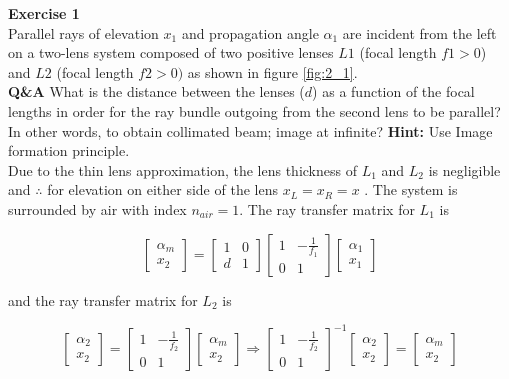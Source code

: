 \documentclass[main.tex]{subfiles}
\begin{document}
\textbf{Exercise 1}\\
Parallel rays of elevation $x_1$ and propagation angle $\alpha_1$ are incident from the left on a two-lens system composed of two positive lenses $L1$ (focal length $f1>0$) and $L2$ (focal length $f2 >0)$ as shown in figure \ref{fig:2_1}.\\

\textbf{Q\&A} What is the distance between the lenses ($d$) as a function of the focal lengths in order for the ray bundle outgoing from the second lens to be parallel? In other words, to obtain collimated beam; image at infinite? \textbf{Hint:} Use Image formation principle.\\


Due to the thin lens approximation, the lens thickness of $L_1$ and $L_2$ is negligible and $\therefore$ for elevation on either side of the lens $x_L = x_R = x$ . The system is surrounded by air with index $n_{air} = 1$. The ray transfer matrix for $L_1$ is

\[
\begin{bmatrix}
    \alpha_m \\
    x_2
\end{bmatrix}
=
\begin{bmatrix}
    1   &   0 \\
    d   &   1
\end{bmatrix}
\begin{bmatrix}
    1   & -\frac{1}{f_1} \\
    0   &   1
\end{bmatrix}
\begin{bmatrix}
     \alpha_{1} \\
    x_1
\end{bmatrix}
\]

and the ray transfer matrix for $L_2$ is

\[
\begin{bmatrix}
    \alpha_2 \\
    x_2
\end{bmatrix}
=
\begin{bmatrix}
    1   & -\frac{1}{f_2} \\
    0   &   1
\end{bmatrix}
\begin{bmatrix}
    \alpha_{m}  \\
    x_2
\end{bmatrix}
\Rightarrow
\begin{bmatrix}
    1   & -\frac{1}{f_2} \\
    0   &   1
\end{bmatrix}^{-1}
\begin{bmatrix}
    \alpha_2 \\
    x_2
\end{bmatrix}
=
\begin{bmatrix}
    \alpha_{m}  \\
    x_2
\end{bmatrix}
\]
\end{document}
